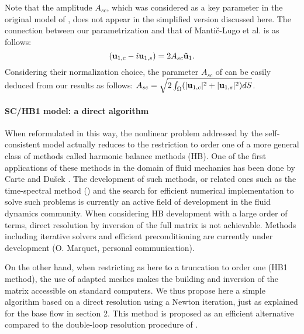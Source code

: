 \documentclass[twocolumn,10pt]{asme2ej}
\newcommand{\be}[1]{ \begin{equation} \label{#1}}
\newcommand{\ee}{\end{equation}}
\begin{document}
Note that the amplitude $A_{sc}$, which was considered as a key parameter in the original model of \cite{MLugo2014}, 
does not appear in the simplified version discussed here. The connection between our parametrization and that of Manti\v{c}-Lugo et al. is as follows:
\be{HBtoSC}
\left( {\bf u }_{1,c} - i {\bf u }_{1,s} \right) = 2 A_{sc} \tilde{{\bf u }}_1.
\ee 
Considering their normalization choice, the parameter $A_{sc}$ of \cite{MLugo2014} can be easily deduced from our results as follows:
$A_{sc} = \sqrt{2 \int_\Omega ( |{\bf u }_{1,c}|^2+ |{\bf u }_{1,s}|^2) d S} $.








\paragraph{SC/HB1 model: a direct algorithm }


When reformulated in this way, the nonlinear problem addressed by the self-consistent model actually reduces to the restriction to order one of a more general class of methods called harmonic balance methods (HB).
One of the first applications of these methods in the domain of fluid mechanics has been done by Carte and Du\v{s}ek \cite{CarteDusek1995,CarteDusekfraunie1996}.
The development of such methods, or related ones such as the time-spectral method (\cite{HallThomasClark2002}) and the search for efficient numerical implementation to solve such problems is currently an active field of development in the fluid dynamics community.
When considering HB development with a large order of terms, direct resolution by inversion of the full matrix is not achievable. Methods including iterative solvers and efficient preconditioning are currently under development (O. Marquet, personal communication).

On the other hand, when restricting as here to a truncation to order one (HB1 method), the use of adapted meshes makes the building and inversion of the matrix accessible on standard computers.
We thus propose here a simple algorithm based on a direct resolution using a Newton iteration, just as explained for the base flow in section 2. This method is proposed as an efficient alternative compared to the double-loop resolution procedure of \cite{MLugo2014}.
\end{document}

